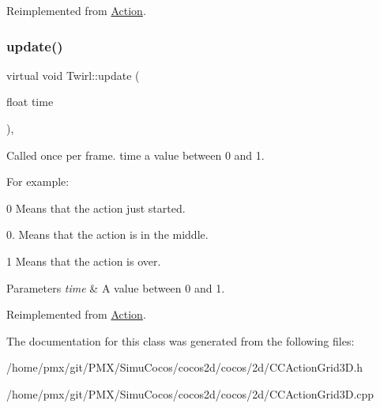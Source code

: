 Reimplemented from \hyperlink{classAction_a937e646e63915e33ad05ba149bfcf239}{Action}.

\mbox{\label{classTwirl_acd70f7860c9a7c7aadf3b75051aa0857}} 
\subsubsection{\texorpdfstring{update()}{update()}\hspace{0.1cm}{\footnotesize\ttfamily [2/2]}}
{\footnotesize\ttfamily virtual void Twirl\+::update (\begin{DoxyParamCaption}\item[{float}]{time }\end{DoxyParamCaption})\hspace{0.3cm}{\ttfamily [override]}, {\ttfamily [virtual]}}

Called once per frame. time a value between 0 and 1.

For example\+:
\begin{DoxyItemize}
\item 0 Means that the action just started.
\item 0. Means that the action is in the middle.
\item 1 Means that the action is over.
\end{DoxyItemize}


\begin{DoxyParams}{Parameters}
{\em time} & A value between 0 and 1. \\
\hline
\end{DoxyParams}


Reimplemented from \hyperlink{classAction_a937e646e63915e33ad05ba149bfcf239}{Action}.



The documentation for this class was generated from the following files\+:\begin{DoxyCompactItemize}
\item 
/home/pmx/git/\+P\+M\+X/\+Simu\+Cocos/cocos2d/cocos/2d/C\+C\+Action\+Grid3\+D.\+h\item 
/home/pmx/git/\+P\+M\+X/\+Simu\+Cocos/cocos2d/cocos/2d/C\+C\+Action\+Grid3\+D.\+cpp\end{DoxyCompactItemize}
